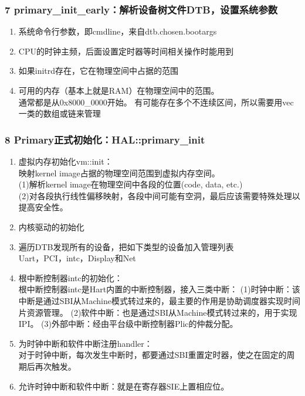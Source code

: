 \documentclass[
8pt, %
]{beamer}
\begin{document}
	\begin{frame}
		\frametitle{7 primary\_init\_early：解析设备树文件DTB，设置系统参数}
		\begin{enumerate}
			\item 系统命令行参数，即cmdline，来自dtb.chosen.bootargs
			\item CPU的时钟主频，后面设置定时器等时间相关操作时能用到
			\item 如果initrd存在，它在物理空间中占据的范围
			\item 可用的内存（基本上就是RAM）在物理空间中的范围。\\
			通常都是从0x8000\_0000开始。
			有可能存在多个不连续区间，所以需要用vec一类的数组或链来管理
		\end{enumerate}
	\end{frame}

	\begin{frame}
		\frametitle{8 Primary正式初始化：HAL::primary\_init}
		\begin{enumerate}
			\item 虚拟内存初始化vm::init：\\
			映射kernel image占据的物理空间范围到虚拟内存空间。\\
			(1)解析kernel image在物理空间中各段的位置(code, data, etc.)\\
			(2)对各段执行线性偏移映射，各段中间可能有空洞，最后应该需要特殊处理以提高安全性。
			\item 内核驱动的初始化
			\item 遍历DTB发现所有的设备，把如下类型的设备加入管理列表\\
			Uart，PCI，intc，Display和Net
			\item 根中断控制器intc的初始化：\\
			根中断控制器intc是Hart内置的中断控制器，接入三类中断：
			(1)时钟中断：该中断是通过SBI从Machine模式转过来的，最主要的作用是协助调度器实现时间片资源管理。
			(2)软件中断：也是通过SBI从Machine模式转过来的，用于实现IPI。
			(3)外部中断：经由平台级中断控制器Plic的仲裁分配。
			\item 为时钟中断和软件中断注册handler：\\
			对于时钟中断，每次发生中断时，都要通过SBI重置定时器，使之在固定的周期后再次触发。
			\item 允许时钟中断和软件中断：就是在寄存器SIE上置相应位。
		\end{enumerate}
	\end{frame}
\end{document}
